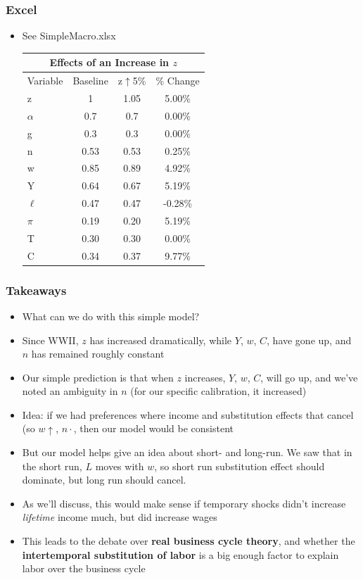 \documentclass{beamer}
\begin{document}
\begin{frame}
\frametitle[alignment=center]{Excel}
\begin{itemize}
\item See SimpleMacro.xlsx
\begin{table}
\begin{tabular}{lccc}
\multicolumn{4}{c}{Effects of an Increase in $z$}\\
\hline\hline
Variable & Baseline & z$\uparrow$5\% & \% Change\\
\hline
z & 1 & 1.05 & 5.00\%\\
$\alpha$ & 0.7 & 0.7 & 0.00\%\\
g & 0.3 & 0.3 & 0.00\%\\
n & 0.53 & 0.53 & 0.25\%\\
w & 0.85 & 0.89 & 4.92\%\\
Y & 0.64 & 0.67 & 5.19\%\\
$\ell$ & 0.47 & 0.47 & -0.28\%\\
$\pi$ & 0.19 & 0.20 & 5.19\%\\
T & 0.30 & 0.30 & 0.00\%\\
C & 0.34 & 0.37 & 9.77\%\\
\hline\hline
\end{tabular}
\end{table}
\end{itemize}
\end{frame}


\begin{frame}
\frametitle[alignment=center]{Takeaways}
\begin{itemize}
\item What can we do with this simple model?
\bigskip
\item Since WWII, $z$ has increased dramatically, while $Y$, $w$, $C$, have gone up, and $n$ has remained roughly constant
\bigskip
\item Our simple prediction is that when $z$ increases, $Y$, $w$, $C$, will go up, and we've noted an ambiguity in $n$ (for our specific calibration, it increased)
\bigskip
\item Idea:  if we had preferences where income and substitution effects that cancel (so $w\uparrow$, $n\cdot$, then our model would be consistent
\bigskip
\item But our model helps give an idea about short- and long-run.  We saw that in the short run, $L$ moves with $w$, so short run substitution effect should dominate, but long run should cancel.
\bigskip
\item As we'll discuss, this would make sense if temporary shocks didn't increase \emph{lifetime} income much, but did increase wages
\bigskip
\item This leads to the debate over \textbf{real business cycle theory}, and whether the \textbf{intertemporal substitution of labor} is a big enough factor to explain labor over the business cycle
\end{itemize}
\end{frame}
\end{document}
